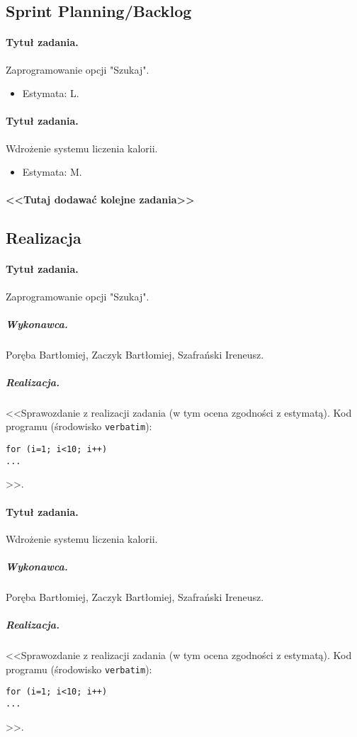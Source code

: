 \documentclass[a4paper]{article}
\begin{document}
\subsection{Sprint Planning/Backlog}

\paragraph{Tytuł zadania.} Zaprogramowanie opcji "Szukaj".
\begin{itemize}
	\item Estymata: L.
\end{itemize}

\paragraph{Tytuł zadania.} Wdrożenie systemu liczenia kalorii.
\begin{itemize}
	\item Estymata: M.
\end{itemize}

\paragraph{<<Tutaj dodawać kolejne zadania>>}

\subsection{Realizacja}

\paragraph{Tytuł zadania.} Zaprogramowanie opcji "Szukaj".
\subparagraph{Wykonawca.} Poręba Bartłomiej, Zaczyk Bartłomiej, Szafrański Ireneusz.
\subparagraph{Realizacja.} <<Sprawozdanie z realizacji zadania (w tym ocena zgodności z estymatą). Kod programu (środowisko \texttt{verbatim}): \begin{verbatim}
for (i=1; i<10; i++)
...
\end{verbatim}>>.

\paragraph{Tytuł zadania.} Wdrożenie systemu liczenia kalorii.
\subparagraph{Wykonawca.} Poręba Bartłomiej, Zaczyk Bartłomiej, Szafrański Ireneusz.
\subparagraph{Realizacja.} <<Sprawozdanie z realizacji zadania (w tym ocena zgodności z estymatą). Kod programu (środowisko \texttt{verbatim}): \begin{verbatim}
for (i=1; i<10; i++)
...
\end{verbatim}>>.
\end{document}
